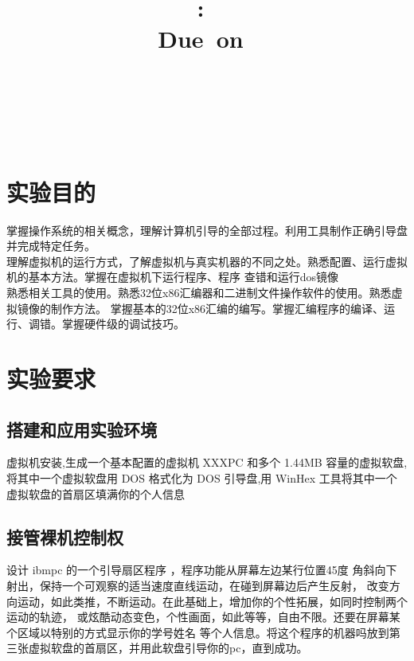 \documentclass[a4paper]{article}
\title{
\vspace{2in}
\textmd{\textbf{\hmwkClass:\ \hmwkTitle}}\\
\normalsize\vspace{0.1in}\small{Due\ on\ \hmwkDueDate}\\
\vspace{0.1in}\large{\textit{\hmwkClassInstructor\ \hmwkClassTime}}
\vspace{3in}
}
\author{\textbf{\LARGE{\hmwkAuthorName}} \\ \\ \textbf{\LARGE{\hmwkAuthorId}}}
\date{} %
\begin{document}

\maketitle


\setcounter{tocdepth}{2} %


\renewcommand{\cftsecleader}{\cftdotfill{\cftdotsep}} %
\renewcommand{\contentsname}{Content} %
\newpage
\tableofcontents
{}
\newpage



\section{实验目的}
掌握操作系统的相关概念，理解计算机引导的全部过程。利用工具制作正确引导盘并完成特定任务。\\ 
理解虚拟机的运行方式，了解虚拟机与真实机器的不同之处。熟悉配置、运行虚拟机的基本方法。掌握在虚拟机下运行程序、程序
查错和运行dos镜像\\ 
熟悉相关工具的使用。熟悉32位x86汇编器和二进制文件操作软件的使用。熟悉虚拟镜像的制作方法。
掌握基本的32位x86汇编的编写。掌握汇编程序的编译、运行、调错。掌握硬件级的调试技巧。
\section{实验要求}

\subsection{搭建和应用实验环境}
虚拟机安装,生成一个基本配置的虚拟机 XXXPC 和多个 1.44MB 
容量的虚拟软盘,将其中一个虚拟软盘用 DOS 格式化为 DOS 引导盘,用 WinHex 工具将其中一个虚拟软盘的首扇区填满你的个人信息
\subsection{接管裸机控制权}
设计 ibmpc 的一个引导扇区程序
，程序功能从屏幕左边某行位置45度
角斜向下射出，保持一个可观察的适当速度直线运动，在碰到屏幕边后产生反射，
改变方向运动，如此类推，不断运动。在此基础上，增加你的个性拓展，如同时控制两个运动的轨迹，
或炫酷动态变色，个性画面，如此等等，自由不限。还要在屏幕某个区域以特别的方式显示你的学号姓名
等个人信息。将这个程序的机器吗放到第三张虚拟软盘的首扇区，并用此软盘引导你的pc，直到成功。
\end{document}
